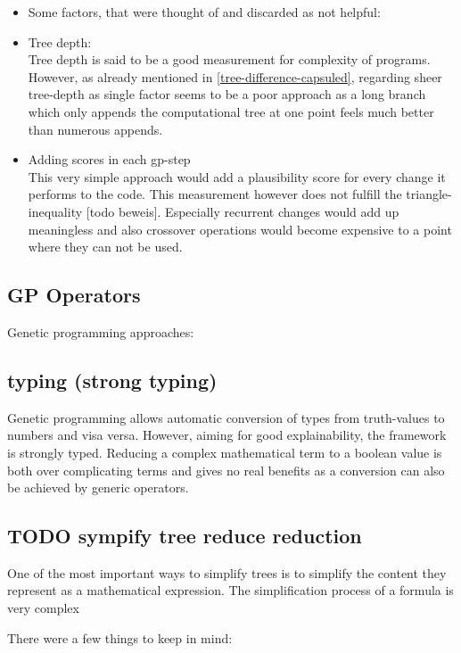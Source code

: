 \begin{itemize}
    \noindent \item[] Some factors, that were thought of and discarded as not helpful:
    
    \item Tree depth:\\
    Tree depth is said to be a good measurement for complexity of programs. However, as already mentioned in \ref{tree-difference-capsuled}, regarding sheer tree-depth as single factor seems to be a poor approach as a long branch which only appends the computational tree at one point feels much better than numerous appends.
    \item Adding scores in each gp-step\\
    This very simple approach would add a plausibility score for every change it performs to the code. This measurement however does not fulfill the triangle-inequality [todo beweis]. Especially recurrent changes would add up meaningless and also crossover operations would become expensive to a point where they can not be used.
\end{itemize}


\subsection{GP Operators}
Genetic programming approaches:

\subsection{typing (strong typing)}
Genetic programming allows automatic conversion of types from truth-values to numbers and visa versa. However, aiming for good explainability, the framework is strongly typed. Reducing a complex mathematical term to a boolean value is both over complicating terms and gives no real benefits as a conversion can also be achieved by generic operators.


\subsection{TODO sympify tree reduce reduction}

One of the most important ways to simplify trees is to simplify the content they represent as a mathematical expression. The simplification process of a formula is very complex 

There were a few things to keep in mind:

